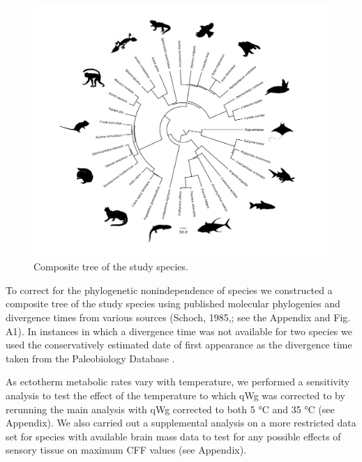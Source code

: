 \begin{figure}[h!]
  \centering
  \includegraphics[width=.95\textwidth]{ch2-time/phylofig.pdf}%
  \caption[Figure 2.]{ Composite tree of the study species.}
  \label{fig:Figure 2.}
\end{figure}


To correct for the phylogenetic nonindependence of species we constructed a composite tree of the study species using published molecular phylogenies and divergence times from various sources \citep{schoch1985preliminary,janossy2011pleistocene,mercer2003effects,hedges2006timetree,wiens2006does,benton2007paleontological,murphy2007using,brown2008strong,li2008optimal,naro2008evolutionary,albert2009effect,lim2010phylogeny,little2010evolutionary,perelman2011molecular} (Schoch, 1985,; see the Appendix and Fig. A1). In instances in which a divergence time was not available for two species we used the conservatively estimated date of first appearance as the divergence time taken from the Paleobiology Database \citep{alroy2008phanerozoic}.



As ectotherm metabolic rates vary with temperature, we performed a sensitivity analysis to test the effect of the temperature to which qWg was corrected to by rerunning the main analysis with qWg corrected to both 5 °C and 35 °C (see Appendix). We also carried out a supplemental analysis on a more restricted data set for species with available brain mass data to test for any possible effects of sensory tissue on maximum CFF values (see Appendix).

